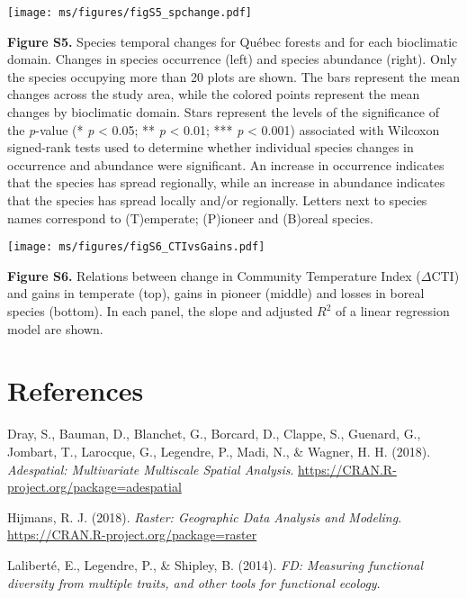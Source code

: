 \documentclass[
]{article}
\begin{document}
\pagebreak

\texttt{[image: ms/figures/figS5\_spchange.pdf]}

\textbf{Figure S5.} Species temporal changes for Québec forests and for
each bioclimatic domain. Changes in species occurrence (left) and
species abundance (right). Only the species occupying more than 20 plots
are shown. The bars represent the mean changes across the study area,
while the colored points represent the mean changes by bioclimatic
domain. Stars represent the levels of the significance of the
\emph{p}-value (* \emph{p} \textless{} 0.05; ** \emph{p} \textless{}
0.01; *** \emph{p} \textless{} 0.001) associated with Wilcoxon
signed-rank tests used to determine whether individual species changes
in occurrence and abundance were significant. An increase in occurrence
indicates that the species has spread regionally, while an increase in
abundance indicates that the species has spread locally and/or
regionally. Letters next to species names correspond to (T)emperate;
(P)ioneer and (B)oreal species.

\pagebreak

\texttt{[image: ms/figures/figS6\_CTIvsGains.pdf]}

\textbf{Figure S6.} Relations between change in Community Temperature
Index (\(\Delta\)CTI) and gains in temperate (top), gains in pioneer
(middle) and losses in boreal species (bottom). In each panel, the slope
and adjusted \(R^2\) of a linear regression model are shown.

\pagebreak

\hypertarget{references}{%
\section*{References}\label{references}}

\hypertarget{refs}{}
\leavevmode\hypertarget{ref-dray_adespatial_2018}{}%
Dray, S., Bauman, D., Blanchet, G., Borcard, D., Clappe, S., Guenard,
G., Jombart, T., Larocque, G., Legendre, P., Madi, N., \& Wagner, H. H.
(2018). \emph{Adespatial: Multivariate Multiscale Spatial Analysis}.
\url{https://CRAN.R-project.org/package=adespatial}

\leavevmode\hypertarget{ref-hijmans_raster_2018}{}%
Hijmans, R. J. (2018). \emph{Raster: Geographic Data Analysis and
Modeling}. \url{https://CRAN.R-project.org/package=raster}

\leavevmode\hypertarget{ref-laliberte_fd_2014}{}%
Laliberté, E., Legendre, P., \& Shipley, B. (2014). \emph{FD: Measuring
functional diversity from multiple traits, and other tools for
functional ecology}.
\end{document}
